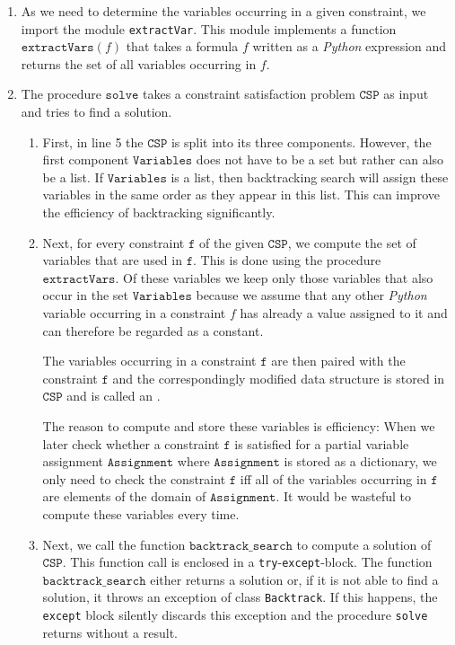 \begin{enumerate}
\item As we need to determine the variables occurring in a given constraint, we import the module
      \texttt{extractVar}.  This module implements a function $\texttt{extractVars}(f)$ that takes
      a formula $f$ written as a \textsl{Python} expression and returns the set of all variables occurring in
      $f$. 

\item The procedure $\texttt{solve}$ takes a constraint satisfaction problem $\texttt{CSP}$ as input and tries
      to find a solution.    
      \begin{enumerate}
      \item First, in line 5 the $\texttt{CSP}$ is split into its three components.  However, the first
            component $\texttt{Variables}$ does not have to be a set but rather can also be a list.
            If $\texttt{Variables}$ is a list, then backtracking search will assign these variables 
            in the same order as they appear in this list.  This can improve the efficiency of backtracking
            significantly. 
      \item Next, for every constraint $\texttt{f}$ of the given $\texttt{CSP}$, we compute the set of variables that
            are used in $\texttt{f}$.  This is done using the procedure $\texttt{extractVars}$.
            Of these variables we keep only those variables that also occur in the set $\texttt{Variables}$
            because we assume that any other \textsl{Python} variable occurring in a constraint $f$ has already
            a value assigned to it and can therefore be regarded as a constant.

            The variables occurring in a constraint $\texttt{f}$ are then paired with the constraint $\texttt{f}$ and
            the correspondingly modified data structure is stored in $\texttt{CSP}$ and is called an
            .

            The reason to compute and store these variables is efficiency: When we later check whether a constraint $\texttt{f}$
            is satisfied for a partial variable assignment $\texttt{Assignment}$ where $\texttt{Assignment}$ is
            stored as a dictionary, we only need to check the constraint $\texttt{f}$ iff all of the variables occurring
            in $\texttt{f}$ are elements of the domain of $\texttt{Assignment}$.   It would be wasteful to compute
            these variables every time.
      \item Next, we call the function $\texttt{backtrack\_search}$ to compute a solution of $\texttt{CSP}$.
            This function call is enclosed in a \texttt{try}-\texttt{except}-block.
            The function $\texttt{backtrack\_search}$ either returns a solution or, if it is not able to
            find a solution, it throws an exception of class \texttt{Backtrack}.  If this happens,
            the \texttt{except} block silently discards this exception and the procedure \texttt{solve} returns
            without a result.
   \end{enumerate}
 \end{enumerate}

